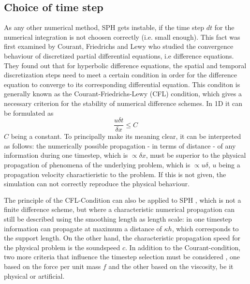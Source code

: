 \documentclass{report}
\begin{document}
\subsection{Choice of time step}
\label{sec:TmeStepChoice}
As any other numerical method, SPH gets instable, if the time step $dt$ for the numerical integration is not choosen correctly (i.e. small enough). 
This fact was first examined by Courant, Friedrichs and Lewy \cite{Courant1928} who studied the convergence behaviour of discretized partial differential equations, i.e difference equations. They found out that for hyperbolic difference equations, the spatial and temporal discretization steps need to meet a certain condition in order for the difference equation to converge to its  corresponding differential equation. This conditon is generally known as the Courant-Friedrichs-Lewy (CFL) condition, which gives a necessary criterion for the stability of numerical difference schemes.
In 1D it can be formulated as
\begin{equation}
 \frac{u\delta t}{\delta x}\leq C
\end{equation}
$C$ being a constant.
To principally make its meaning clear, it can be interpreted as follows:
the numerically possible propagation - in terms of distance - of any information during one timestep, which is $\propto\delta x$, must be superior to the physical propagation of phenomena of the underlying problem, which is $\propto u\delta$, $u$ being a propagation velocity charactieristic to the problem. If this is not given, the simulation can not correctly reproduce the physical behaviour. 

The principle of the CFL-Condition can also be applied to SPH \cite{Monaghan1989}, which is not a finite difference scheme, but where a characteristic numerical propagation can still be described using the smoothing length as length scale: in one timestep information can propagate at maximum a distance of $\kappa h$, which corresponds to the support length. On the other hand, the characteristic propagation speed for the physical problem is the soundspeed $c$. 
In addition to the Courant-condition, two more criteria that influence the timestep selection must be considered \cite{Monaghan1992}, one based on the force per unit mass $f$ and the other based on the viscosity, be it physical or artificial.
\end{document}
